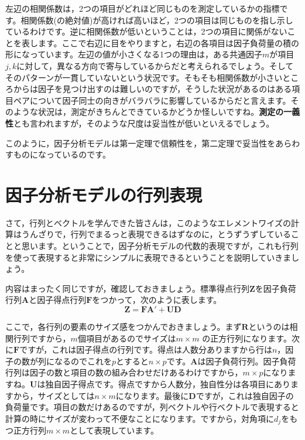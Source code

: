 \documentclass{ltjsbook}
\begin{document}
左辺の相関係数は，2つの項目がどれほど同じものを測定しているかの指標です。相関係数(の絶対値)が高ければ高いほど，2つの項目は同じものを指し示しているわけです。逆に相関係数が低いということは，2つの項目に関係がないことを表します。ここで右辺に目をやりますと，右辺の各項目は因子負荷量の積の形になっています。左辺の値が小さくなる1つの理由は，ある共通因子$m$が項目$j,k$に対して，異なる方向で寄与しているからだと考えられるでしょう。そしてそのパターンが一貫していないという状況です。そもそも相関係数が小さいところからは因子を見つけ出すのは難しいのですが，そうした状況があるのはある項目ペアについて因子同士の向きがバラバラに影響しているからだと言えます。そのような状況は，測定がきちんとできているかどうか怪しいですね。\textbf{測定の一義性}とも言われますが，そのような尺度は妥当性が低いといえるでしょう。

このように，因子分析モデルは第一定理で信頼性を，第二定理で妥当性をあらわすものになっているのです。

\section{ 因子分析モデルの行列表現}
さて，行列とベクトルを学んできた皆さんは，このようなエレメントワイズの計算はうんざりで，行列でまるっと表現できるはずなのに，とうずうずしていることと思います。ということで，因子分析モデルの代数的表現ですが，これも行列を使って表現すると非常にシンプルに表現できるということを説明していきましょう。

内容はまったく同じですが，確認しておきましょう。標準得点行列$\bm{Z}$を因子負荷行列$\bm{A}$と因子得点行列$\bm{F}$をつかって，次のように表します。
\begin{equation}
	\bm{Z} = \bm{F} \bm{A} ' + \bm{U} \bm{D}
\end{equation}

ここで，各行列の要素のサイズ感をつかんでおきましょう。まず$\bm{R}$というのは相関行列ですから，$m$個項目があるのでサイズは$m \times m$ の正方行列になります。次に$\bm{F}$ですが，これは因子得点の行列です。得点は人数分ありますから行は$n$，因子の数が列になるのでこれを$p$とすると$n\times p$です。$\bm{A}$は因子負荷行列。因子負荷行列は因子の数と項目の数の組み合わせだけあるわけですから，$m \times p$になりますね。$\bm{U}$は独自因子得点です。得点ですから人数分，独自性分は各項目にありますから，サイズとしては$n \times m$になります。最後に$\bm{D}$ですが，これは独自因子の負荷量です。項目の数だけあるのですが，列ベクトルや行ベクトルで表現すると計算の時にサイズが変わって不便なことになります。ですから，対角項に$d_j$をもつ正方行列$m \times m$として表現しています。
\end{document}
